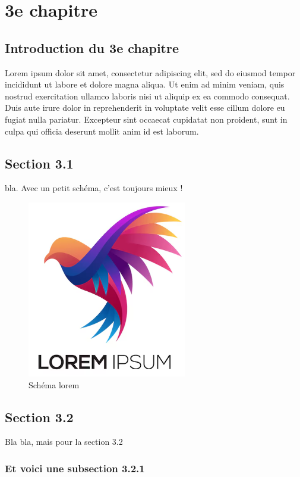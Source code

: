 
\chapter{3e chapitre}

\section*{Introduction du 3e chapitre}

Lorem ipsum dolor sit amet, consectetur adipiscing elit, sed do eiusmod tempor incididunt ut labore et dolore magna aliqua. Ut enim ad minim veniam, quis nostrud exercitation ullamco laboris nisi ut aliquip ex ea commodo consequat. Duis aute irure dolor in reprehenderit in voluptate velit esse cillum dolore eu fugiat nulla pariatur. Excepteur sint occaecat cupidatat non proident, sunt in culpa qui officia deserunt mollit anim id est laborum.

\section{Section 3.1}

bla.
Avec un petit schéma, c'est toujours mieux !
\begin{figure}[H]
    \centering
    \includegraphics[width=0.45\linewidth]{Images/30/lorem.png}
    \caption{Schéma lorem}
    \label{fig:LoremLabel}
\end{figure}

\section{Section 3.2}
Bla bla, mais pour la section 3.2 

\subsection{Et voici une subsection 3.2.1}

